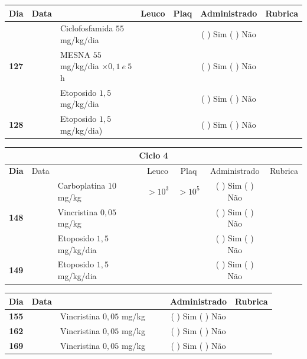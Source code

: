\documentclass[11pt,a4paper,oldfontcommands]{memoir}
\begin{document}
\begin{center}
\begin{longtable}{p{1cm}c|p{5cm}|p{1.5cm}p{1.5cm}|c|c}
	\hline
	\multicolumn{1}{c|}{\multirow{1}{*}{\textbf{Dia}}}&{Data}&{}&\multicolumn{1}{c|}{Leuco}&\multicolumn{1}{c|}{Plaq}&{Administrado}&{Rubrica} \\
    \hline
    \multicolumn{1}{c|}{\multirow{3}{*}{\textbf{127}}}&&{Ciclofosfamida \(55\) mg/kg/dia}&\multicolumn{1}{c|}{}&&{(  ) Sim (  ) Não}&\\
    \cline{4-5}
    \multicolumn{1}{c|}{}&&{MESNA \(55\) mg/kg/dia \(\times 0,1 \:e\: 5\)h}&&&{(  ) Sim (  ) Não}&\\
    \multicolumn{1}{c|}{}&&{Etoposido \(1,5\) mg/kg/dia}&&&{(  ) Sim (  ) Não}&\\
    \hline
    \multicolumn{1}{c|}{\multirow{1}{*}{\textbf{128}}}&&{Etoposido \(1,5\) mg/kg/dia)}&{}&&{(  ) Sim (  ) Não}&\\
    \hline
\end{longtable}
\begin{longtable}{p{1cm}c|p{5cm}|p{1.5cm}p{1.5cm}|c|c}
	\hline
	\multicolumn{7}{c}{Ciclo 4} \\
	\hline
	\multicolumn{1}{c|}{\multirow{1}{*}{\textbf{Dia}}}&{Data}&{}&\multicolumn{1}{c|}{Leuco}&\multicolumn{1}{c|}{Plaq}&{Administrado}&{Rubrica} \\
    \hline
    \multicolumn{1}{c|}{\multirow{3}{*}{\textbf{148}}}&\multirow{2}{*}{}&{Carboplatina \(10\) mg/kg}&\multicolumn{1}{c|}{\(>10^3\)}&\multicolumn{1}{c|}{\(>10^5\)}&{(  ) Sim (  ) Não}&\\
    \cline{4-5}
    \multicolumn{1}{c|}{}&&{Vincristina \(0,05\) mg/kg}&\multicolumn{1}{c|}{}&&{(  ) Sim (  ) Não}&\\
    \cline{4-5}
    \multicolumn{1}{c|}{}&\multirow{1}{*}{}&{Etoposido \(1,5\) mg/kg/dia}&{}&&{(  ) Sim (  ) Não}&\\
    \cline{1-3}\cline{6-6}
    \multicolumn{1}{c|}{\textbf{149}}&\multirow{1}{*}{}&{Etoposido \(1,5\) mg/kg/dia}&{}&&{(  ) Sim (  ) Não}&\\
    \hline
\end{longtable}
\begin{longtable}{p{1cm}c|p{4cm}|p{2cm}p{2cm}|c|c}
	\hline
	\multicolumn{1}{c|}{\multirow{1}{*}{\textbf{Dia}}}&{Data}&{}&{}&&{Administrado}&{Rubrica} \\
    \hline
    \multicolumn{1}{c|}{\textbf{155}}&&{Vincristina \(0,05\) mg/kg}&\multicolumn{1}{c}{}&&{(  ) Sim (  ) Não}&\\
    \hline
    \multicolumn{1}{c|}{\textbf{162}}&&{Vincristina \(0,05\) mg/kg}&\multicolumn{1}{c}{}&&{(  ) Sim (  ) Não}&\\
    \hline
    \multicolumn{1}{c|}{\textbf{169}}&&{Vincristina \(0,05\) mg/kg}&\multicolumn{1}{c}{}&&{(  ) Sim (  ) Não}&\\
    \hline
\end{longtable}


\end{center}
\end{document}
